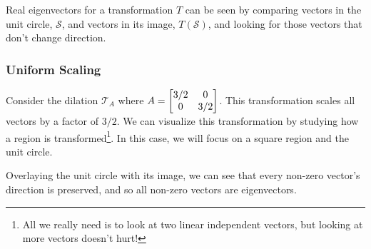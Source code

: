 \newcommand{\EVCaseSeparator}{%
	\par
	\vspace{0.5\baselineskip}
	\hrule
	\vspace{0.6\baselineskip}
}

\newcommand{\EVNote}[1]{%
	\par\medskip
	\begin{samepage}
		\centering #1\par
	\end{samepage}%
}




Real eigenvectors for a transformation $T$ can be seen by comparing vectors in the unit circle, $\mathcal{S}$, and vectors in its image, $T(\mathcal{S})$,
 and looking for those vectors that don't change direction.

\subsubsection*{Uniform Scaling}
Consider the dilation $\mathcal{T}_{A}$ where $A=\begin{bmatrix}3/2 & 0\\ 0 & 3/2\end{bmatrix}$. This transformation scales all vectors by a factor of $3/2$.
We can visualize this transformation by studying how a region is transformed\footnote{ All we really need is to look at two linear independent vectors, but looking at more vectors doesn't hurt!}. In this case, we will focus on a square region and the unit 
circle.

\begin{center}
\end{center}

Overlaying the unit circle with its image, we can see that every non-zero vector's direction is preserved, and so all non-zero vectors are eigenvectors. 


